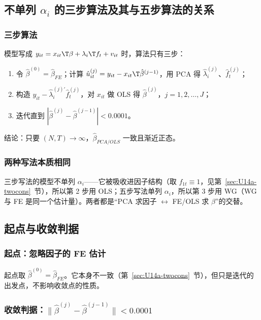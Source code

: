\subsection{不单列 \texorpdfstring{$\alpha_i$}{alpha\_i} 的三步算法及其与五步算法的关系}

\subsubsection{三步算法}

模型写成 $y_{it}=x_{it}\T\beta+\lambda_i\T f_t+v_{it}$ 时，算法只有三步：
\begin{enumerate}
  \item 令 $\hat\beta^{(0)}=\hat\beta_{FE}$；计算 $\hat u^{(j)}_{it}=y_{it}-x_{it}\T\hat\beta^{(j-1)}$，用 PCA 得 $\hat\lambda_i^{(j)}$、$\hat f_t^{(j)}$；
  \item 构造 $y_{it}-\hat\lambda_i^{(j)\prime}\hat f_t^{(j)}$，对 $x_{it}$ 做 OLS 得 $\hat\beta^{(j)}$，$j=1,2,\dots,J$；
  \item 迭代直到 $|\hat\beta^{(j)}-\hat\beta^{(j-1)}|<0.0001$。
\end{enumerate}
结论：只要 $(N,T)\to\infty$，$\hat\beta_{PCA/OLS}$ 一致且渐近正态。

\subsubsection{两种写法本质相同}

三步写法的模型不单列 $\alpha_i$——它被吸收进因子结构（取 $f_{1t}\equiv1$，见第~\ref{sec:U14a-twocons}~节），所以第 2 步用 OLS；五步写法单列 $\alpha_i$，所以第 3 步用 WG（WG 与 FE 是同一个估计量）。两者都是“PCA 求因子 $\leftrightarrow$ FE/OLS 求 $\beta$”的交替。

\subsection{起点与收敛判据}

\subsubsection{起点：忽略因子的 FE 估计}

起点取 $\hat\beta^{(0)}=\hat\beta_{FE}$。它本身不一致（第~\ref{sec:U14a-twocons}~节），但只是迭代的出发点，不影响收敛点的性质。

\subsubsection{收敛判据：\texorpdfstring{$\|\hat\beta^{(j)}-\hat\beta^{(j-1)}\|<0.0001$}{||beta(j)-beta(j-1)|| < 0.0001}}

